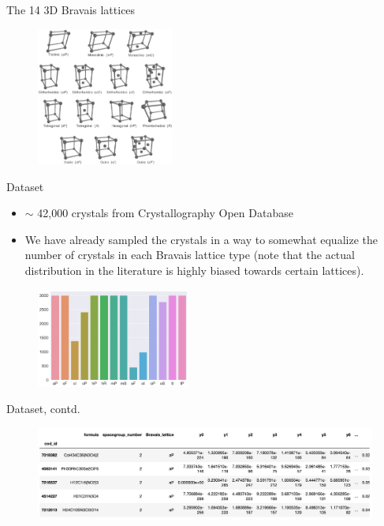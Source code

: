 \documentclass[aspectratio=169]{beamer}
\begin{document}
\begin{frame}{The 14 3D Bravais lattices}
\begin{figure}
    \includegraphics[width=0.4\textwidth]{figures/bravais_lattices.png}
\end{figure}
\end{frame}


\begin{frame}{Dataset}
    \begin{itemize}
        \item $\sim$ 42,000 crystals from Crystallography Open Database
        \item We have already sampled the crystals in a way to somewhat equalize the number of crystals in each Bravais lattice type (note that the actual distribution in the literature is highly biased towards certain lattices).  
    \end{itemize}
    \begin{figure}
        \centering
        \includegraphics[width=0.45\textwidth]{figures/lab3_data_distribution.png}
    \end{figure}
\end{frame}


\begin{frame}{Dataset, contd.}
\begin{figure}
    \centering
    \includegraphics[width=\textwidth]{figures/cod_csv_fmt.png}
\end{figure}
\end{frame}
\end{document}
